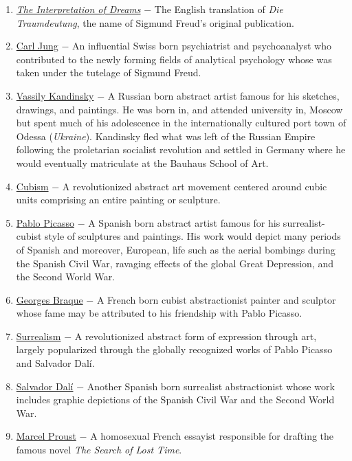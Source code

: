 \documentclass[12pt]{article}
\begin{document}
\begin{flushleft}
\begin{enumerate}
\item \underline{\emph{The Interpretation of Dreams}} $-$ The English translation of \emph{Die Traumdeutung}, the name of Sigmund Freud's original publication. 

\item \underline{Carl Jung} $-$ An influential Swiss born  psychiatrist and psychoanalyst who contributed to the newly forming fields of analytical psychology whose was taken under the tutelage of Sigmund Freud.

\item \underline{Vassily Kandinsky} $-$ A Russian born abstract artist famous for his sketches, drawings, and paintings. He was born in, and attended university in, Moscow but spent much of his adolescence in the internationally cultured port town of Odessa (\emph{Ukraine}). Kandinsky fled what was left of the Russian Empire following the proletarian socialist revolution and settled in Germany where he would eventually matriculate at the Bauhaus School of Art.

\item \underline{Cubism} $-$ A revolutionized abstract art movement centered around cubic units comprising an entire painting or sculpture.

\item \underline{Pablo Picasso} $-$ A Spanish born abstract artist famous for his surrealist-cubist style of sculptures and paintings. His work would depict many periods of Spanish and moreover, European, life such as the aerial bombings during the Spanish Civil War, ravaging effects of the global Great Depression, and the Second World War.

\item \underline{Georges Braque} $-$ A French born cubist abstractionist painter and sculptor whose fame may be attributed to his friendship with Pablo Picasso.

\item \underline{Surrealism} $-$ A revolutionized abstract form of expression through art, largely popularized through the globally recognized works of Pablo Picasso and Salvador Dal\'i. 

\item \underline{Salvador Dal\'i} $-$ Another Spanish born surrealist abstractionist whose work includes graphic depictions of the Spanish Civil War and the Second World War.

\item \underline{Marcel Proust} $-$ A homosexual French essayist responsible for drafting the famous novel \emph{The Search of Lost Time}. 


\end{enumerate}
\end{flushleft}
\end{document}
